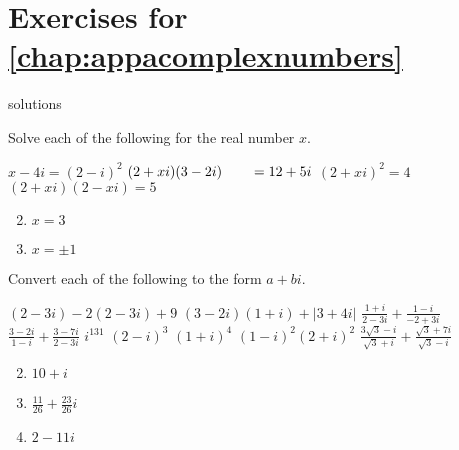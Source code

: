 \section*{Exercises for \ref{chap:appacomplexnumbers}}

\begin{Filesave}{solutions}
\end{Filesave}

\begin{multicols}{2}
\begin{ex}
Solve each of the following for the real number $x$.

\begin{exenumerate}
\exitem $x-4i = (2-i)^2$
\exitem $(2+xi)(3-2i) \\ \hspace*{2em}= 12+5i$
\exitem $(2+xi)^2=4$
\exitem $(2+xi)(2-xi)=5$
\end{exenumerate}
\begin{sol}
\begin{enumerate}[label={\alph*.}]
\setcounter{enumi}{1}
\item $x = 3$

\setcounter{enumi}{3}
\item  $x = \pm 1$

\end{enumerate}
\end{sol}
\end{ex}

\columnbreak

\begin{ex}
Convert each of the following to the form $a + bi$.

\begin{exenumerate}
\exitem* $(2-3i)-2(2-3i)+9$
\exitem*  $(3-2i)(1+i)+|3+4i|$
\exitem $\frac{1+i}{2-3i} + \frac{1-i}{-2+3i}$
\exitem $\frac{3-2i}{1-i} + \frac{3-7i}{2-3i}$
\exitem $i^{131}$
\exitem $(2 - i)^{3}$
\exitem $(1 + i)^{4}$
\exitem $(1 - i)^{2}(2 + i)^{2}$
\exitem* $\frac{3\sqrt{3}-i}{\sqrt{3}+i} + \frac{\sqrt{3}+7i}{\sqrt{3}-i}$
\end{exenumerate}
\begin{sol}
\begin{enumerate}[label={\alph*.}]
\setcounter{enumi}{1}
\item  $10 + i$

\setcounter{enumi}{3}
\item $\frac{11}{26} + \frac{23}{26}i$


\setcounter{enumi}{5}
\item $ 2 - 11i$


\end{enumerate}
\end{sol}
\end{ex}
\end{multicols}
